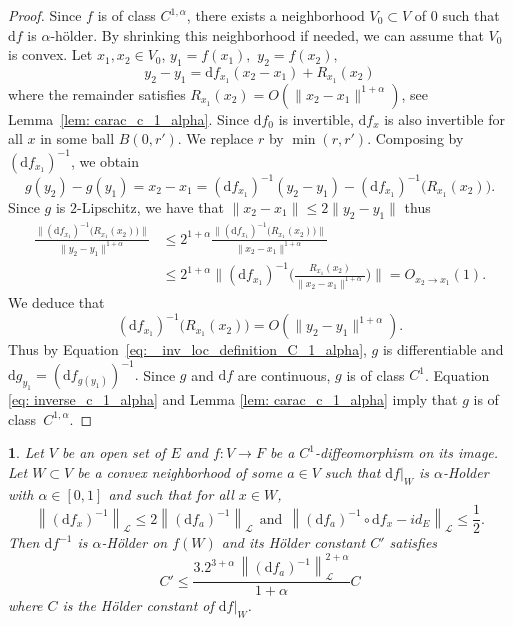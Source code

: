 \documentclass[11pt,reqno,a4paper]{article}%
\newtheorem{lemma}[theorem]{\sc{Lemma}}
\theoremstyle{definition}
\theoremstyle{remark}
\renewcommand{\leq}{\leqslant}
\newcommand{\opnorm}[1]{{\left\| #1 \right\|}_{\mathcal{L}}}
\renewcommand{\d}{\mathrm{d}}
\renewcommand{\d}{\mathrm{d}}
\begin{document}
\begin{proof}
\noindent
Since $f$ is of class $C^{1,\alpha}$, there exists  a neighborhood $V_0\subset V$ of $0$ such that $\d f$ is $\alpha$-hölder. By shrinking this neighborhood if needed, we can assume that $V_0$ is convex. Let $x_1,x_2\in V_0$, $y_1=f(x_1),$ $y_2=f(x_2),$ 
    $$ y_2 - y_1 = \d f_{x_1}(x_2-x_1) + R_{x_1}(x_2)$$
where the remainder satisfies $R_{x_1}(x_2) = O(\|x_2-x_1\|^{1+\alpha})$, see Lemma~\ref{lem: carac_c_1_alpha}. 
 Since $\d f_0$ is invertible, $\d f_x$ is also invertible for all $x$ in some ball $B(0,r')$. We replace $r$ by $\min(r,r')$. Composing by $(\d f_{x_1})^{-1}$, we obtain
    \begin{equation} \label{eq: _inv_loc_definition_C_1_alpha}
        g(y_2) - g(y_1) = x_2-x_1 = (\d f_{x_1})^{-1}(y_2 - y_1) - (\d f_{x_1})^{-1}\big(R_{x_1}(x_2)\big).
    \end{equation}
    Since $g$ is $2$-Lipschitz, we have that $\|x_2-x_1\| \leq 2 \|y_2-y_1\|$ thus
    \begin{align*}
        \frac{\| (\d f_{x_1})^{-1}\big(R_{x_1}(x_2)\big) \|}{\|y_2-y_1\|^{1+\alpha}} &\leq 2^{1+\alpha} \frac{\| (\d f_{x_1})^{-1}\big(R_{x_1}(x_2)\big) \|}{\|x_2-x_1\|^{1+\alpha}} \\ 
        &\leq 2^{1+\alpha} \bigg\| (\d f_{x_1})^{-1}\bigg( \frac{R_{x_1}(x_2)}{\|x_2-x_1\|^{1+\alpha}} \bigg) \bigg\| = O_{x_2\to x_1}(1).
    \end{align*}
    We deduce that 
    \begin{equation} \label{eq: inverse_c_1_alpha}
        (\d f_{x_1})^{-1}\big(R_{x_1}(x_2)\big) = O(\|y_2-y_1\|^{1+\alpha}).
    \end{equation}
    Thus by Equation~\eqref{eq: _inv_loc_definition_C_1_alpha}, $g$ is differentiable and 
    $\d g_{y_1} = (\d f_{g(y_1)})^{-1}.$
    Since $g$ and $\d f$ are continuous, $g$ is of class $C^1$. Equation \eqref{eq: inverse_c_1_alpha} and Lemma \ref{lem: carac_c_1_alpha} imply that $g$ is of class~$C^{1,\alpha}$.
\end{proof}

\begin{lemma} \label{lem: constant_holder_inversion_local}
    Let $V$ be an open set of $E$ and $f : V \to F$ be a $C^{1}$-diffeomorphism on its image.
    Let $W \subset V$ be a convex neighborhood of some $a \in V$ such that $\d f |_W$ is $\alpha$-Holder with $\alpha \in [ 0 , 1]$ and such that for all $x \in W$, 
    \begin{equation} \label{eq: condition_alpha_holder_sur_tout_ouvert}
        \opnorm{(\d f_x)^{-1}} \leq 2  \opnorm{(\d f_a)^{-1}} ~~ \text{and} ~~ \opnorm{ (\d f_a)^{-1} \circ \d f_x   - id_E } \leq \frac{1}{2}  .
    \end{equation}
    Then $\d f^{-1}$ is $\alpha$-Hölder on $f(W)$ and its Hölder constant $C'$ satisfies
    $$ C' \leq \frac{ 3.2^{3 + \alpha} \, \opnorm{ (\d f_a)^{-1} }^{2+\alpha}}{1 + \alpha} C$$
    where $C$ is the Hölder constant of $\d f|_W$.
\end{lemma}
\end{document}
